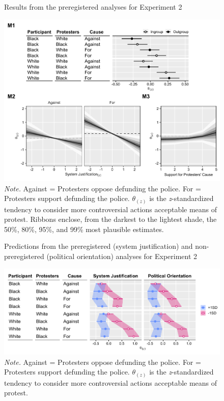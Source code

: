 \documentclass[twocolumn, 11pt, letterpaper]{article}
\begin{document}
\begin{figure}[!t]
\centering
\caption{Results from the preregistered analyses for Experiment 2}
\includegraphics[scale=1]{../Experiment 2/figures/figure-4}
\caption*{\textit{Note.} Against = Protesters oppose defunding the police. For = Protesters support defunding the police. $\theta_{(z)}$ is the \textit{z}-standardized tendency to consider more controversial actions acceptable means of protest. Ribbons enclose, from the darkest to the lightest shade, the 50\%, 80\%, 95\%, and 99\% most plausible estimates.}
\label{fig:f4}
\end{figure}

\begin{figure}[!t]
\centering
\caption{Predictions from the preregistered (system justification) and non-preregistered (political orientation) analyses for Experiment 2}
\includegraphics[scale=1]{../Experiment 2/figures/figure-5}
\caption*{\textit{Note.} Against = Protesters oppose defunding the police. For = Protesters support defunding the police. $\theta_{(z)}$ is the \textit{z}-standardized tendency to consider more controversial actions acceptable means of protest.}
\label{fig:f5}
\end{figure}
\end{document}
